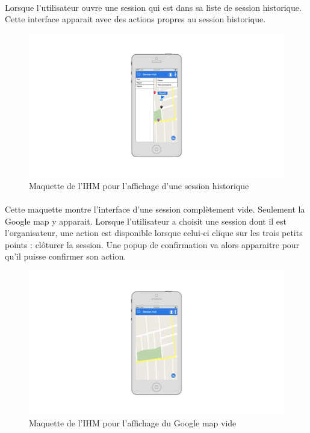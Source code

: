 \documentclass[titlepage, 12pt]{report}
\begin{document}
\clearpage

\paragraph{}Lorsque l'utilisateur ouvre une session qui est dans sa liste de session historique. Cette interface apparait avec des actions propres au session historique.

\begin{figure}[!h]
	\caption{Maquette de l'IHM pour l'affichage d'une session historique}
	\label{history_session}
	\centering
	\includegraphics[scale=0.3]{images/mockups/history_session.png}
\end{figure}

\clearpage

\paragraph{}Cette maquette montre l'interface d'une session complètement vide. Seulement la Google map y apparait. Lorsque l'utilisateur a choisit une session dont il est l'organisateur, une action est disponible lorsque celui-ci clique sur les trois petits points : clôturer la session. Une popup de confirmation va alors apparaitre pour qu'il puisse confirmer son action.

\begin{figure}[!h]
	\caption{Maquette de l'IHM pour l'affichage du Google map vide}
	\label{google_map_view}
	\centering
	\includegraphics[scale=0.3]{images/mockups/google_map_view.png}
\end{figure}
\end{document}
